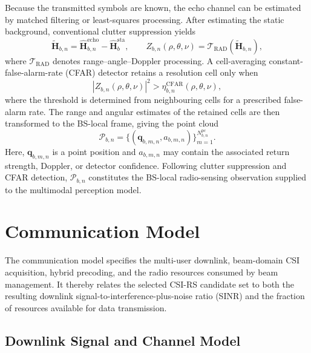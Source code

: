 Because the transmitted symbols are known, the echo channel can be estimated by
matched filtering or least-squares processing.  After estimating the static
background, conventional clutter suppression yields
\begin{equation}
    \widetilde{\mathbf{H}}_{b,n}
    =\widehat{\mathbf{H}}^{\mathrm{echo}}_{b,n}
    -\widehat{\mathbf{H}}^{\mathrm{sta}}_{b},
    \qquad
    Z_{b,n}(\rho,\theta,\nu)
    =\mathcal{T}_{\mathrm{RAD}}
    \!\left(\widetilde{\mathbf{H}}_{b,n}\right),
    \label{eq:system-isac-processing}
\end{equation}
where \(\mathcal{T}_{\mathrm{RAD}}\) denotes range--angle--Doppler processing.
A cell-averaging constant-false-alarm-rate (CFAR) detector retains a resolution
cell only when
\begin{equation}
    \left|Z_{b,n}(\rho,\theta,\nu)\right|^2
    >\eta^{\mathrm{CFAR}}_{b,n}(\rho,\theta,\nu),
    \label{eq:system-isac-cfar}
\end{equation}
where the threshold is determined from neighbouring cells for a prescribed
false-alarm rate.  The range and angular estimates of the retained cells are
then transformed to the BS-local frame, giving the point cloud
\begin{equation}
    \mathcal{P}_{b,n}=
    \{(\mathbf{q}_{b,m,n},a_{b,m,n})\}_{m=1}^{N^{\mathrm{pc}}_{b,n}}.
    \label{eq:system-point-cloud}
\end{equation}
Here, \(\mathbf{q}_{b,m,n}\) is a point position and \(a_{b,m,n}\) may contain
the associated return strength, Doppler, or detector confidence.  Following
clutter suppression and CFAR detection, \(\mathcal{P}_{b,n}\) constitutes the
BS-local radio-sensing observation supplied to the multimodal perception model.

\section{Communication Model}
\label{sec:system-communication}

The communication model specifies the multi-user downlink, beam-domain CSI
acquisition, hybrid precoding, and the radio resources consumed by beam
management.  It thereby relates the selected CSI-RS candidate set to both the
resulting downlink signal-to-interference-plus-noise ratio (SINR) and the
fraction of resources available for data
transmission.

\subsection{Downlink Signal and Channel Model}
\label{subsec:system-downlink-model}

